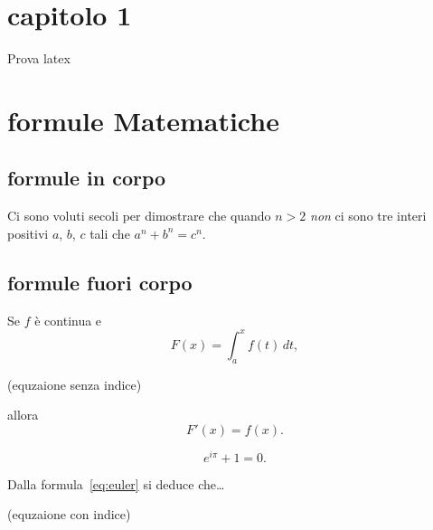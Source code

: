 \documentclass[a4paper]{article}
\begin{document}
\section{capitolo 1}
Prova latex
\section{formule Matematiche}

\subsection{formule in corpo}
Ci sono voluti secoli per
dimostrare che quando $n>2$
\emph{non} ci sono tre interi
positivi $a$, $b$, $c$ tali che $
a^n+b^n=c^n$.

\subsection{formule fuori corpo}

Se $f$ è continua e
\[
F(x)=\int_a^x f(t)\,dt,
\]

(equzaione senza indice)

allora
\begin{equation}
F'(x)=f(x).
\end{equation}


\begin{equation}
	\label{eq:euler}
		e^{i\pi}+1=0.
	\end{equation}

Dalla formula~\eqref{eq:euler} si deduce che\dots

(equzaione con indice)
\end{document}
